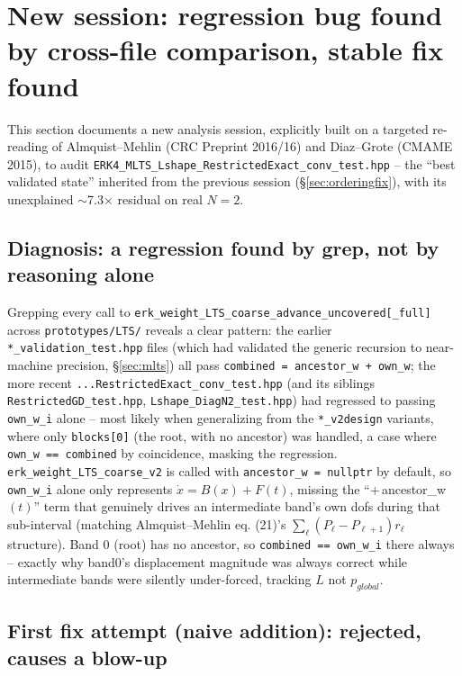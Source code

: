 \documentclass[11pt]{article}
\begin{document}
\section{New session: regression bug found by cross-file comparison,
stable fix found}
\label{sec:regressionfix}

This section documents a new analysis session, explicitly built on a
targeted re-reading of Almquist--Mehlin (CRC Preprint 2016/16) and
Diaz--Grote (CMAME 2015), to audit
\texttt{ERK4\_MLTS\_Lshape\_RestrictedExact\_conv\_test.hpp} -- the
``best validated state'' inherited from the previous session
(\S\ref{sec:orderingfix}), with its unexplained $\sim$7.3$\times$
residual on real $N=2$.

\subsection{Diagnosis: a regression found by grep, not by reasoning
alone}

Grepping every call to
\texttt{erk\_weight\_LTS\_coarse\_advance\_uncovered[\_full]} across
\texttt{prototypes/LTS/} reveals a clear pattern: the earlier
\texttt{*\_validation\_test.hpp} files (which had validated the
generic recursion to near-machine precision, \S\ref{sec:mlts}) all
pass \texttt{combined = ancestor\_w + own\_w}; the more recent
\texttt{...RestrictedExact\_conv\_test.hpp} (and its siblings
\texttt{RestrictedGD\_test.hpp}, \texttt{Lshape\_DiagN2\_test.hpp})
had regressed to passing \texttt{own\_w\_i} alone -- most likely when
generalizing from the \texttt{*\_v2design} variants, where only
\texttt{blocks[0]} (the root, with no ancestor) was handled, a case
where \texttt{own\_w == combined} by coincidence, masking the
regression. \texttt{erk\_weight\_LTS\_coarse\_v2} is called with
\texttt{ancestor\_w = nullptr} by default, so \texttt{own\_w\_i} alone
only represents $\dot x = B(x)+F(t)$, missing the
``$+\,$ancestor\_w$(t)$'' term that genuinely drives an
intermediate band's own dofs during that sub-interval (matching
Almquist--Mehlin eq. (21)'s $\sum_\ell (P_\ell-P_{\ell+1})r_\ell$
structure). Band 0 (root) has no ancestor, so \texttt{combined ==
own\_w\_i} there always -- exactly why band0's displacement magnitude
was always correct while intermediate bands were silently
under-forced, tracking $L$ not $p_{global}$.

\subsection{First fix attempt (naive addition): rejected, causes a
blow-up}
\end{document}
